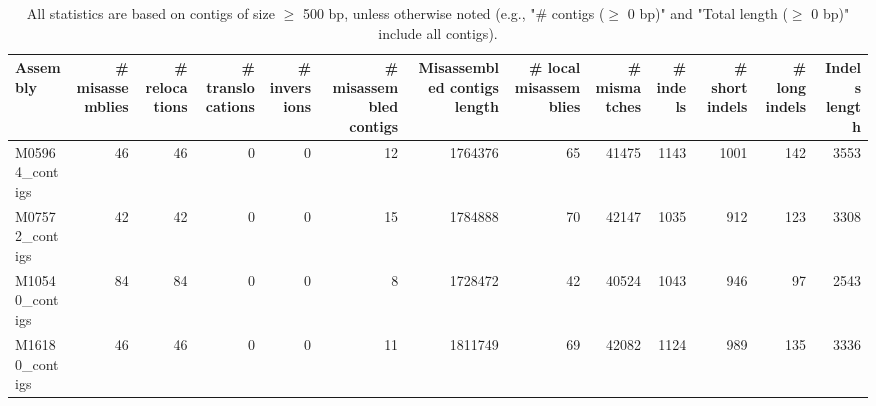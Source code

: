 \documentclass[12pt,a4paper]{article}
\begin{document}
\begin{table}[ht]
\begin{center}
\caption{All statistics are based on contigs of size $\geq$ 500 bp, unless otherwise noted (e.g., "\# contigs ($\geq$ 0 bp)" and "Total length ($\geq$ 0 bp)" include all contigs).}
\begin{tabular}{|l*{12}{|r}|}
\hline
Assembly & \# misassemblies &     \# relocations &     \# translocations &     \# inversions & \# misassembled contigs & Misassembled contigs length & \# local misassemblies & \# mismatches & \# indels &     \# short indels &     \# long indels & Indels length \\ \hline
M05964\_contigs & 46 & 46 & 0 & 0 & 12 & 1764376 & 65 & 41475 & 1143 & 1001 & 142 & 3553 \\ \hline
M07572\_contigs & 42 & 42 & 0 & 0 & 15 & 1784888 & 70 & 42147 & 1035 & 912 & 123 & 3308 \\ \hline
M10540\_contigs & 84 & 84 & 0 & 0 & 8 & 1728472 & 42 & 40524 & 1043 & 946 & 97 & 2543 \\ \hline
M16180\_contigs & 46 & 46 & 0 & 0 & 11 & 1811749 & 69 & 42082 & 1124 & 989 & 135 & 3336 \\ \hline
\end{tabular}
\end{center}
\end{table}
\end{document}
